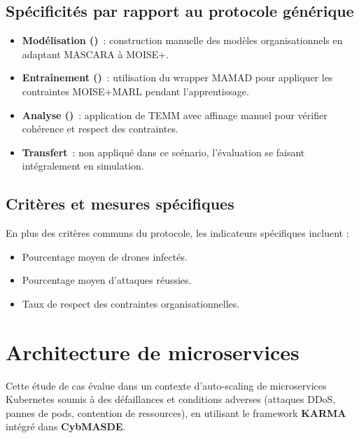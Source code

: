 \subsection{Spécificités par rapport au protocole générique}
\begin{itemize}
  \item \textbf{Modélisation ()}~: construction manuelle des modèles organisationnels en adaptant MASCARA à MOISE+.
  \item \textbf{Entraînement ()}~: utilisation du wrapper MAMAD pour appliquer les contraintes MOISE+MARL pendant l’apprentissage.
  \item \textbf{Analyse ()}~: application de TEMM avec affinage manuel pour vérifier cohérence et respect des contraintes.
  \item \textbf{Transfert}~: non appliqué dans ce scénario, l’évaluation se faisant intégralement en simulation.
\end{itemize}

\subsection{Critères et mesures spécifiques}
En plus des critères communs du protocole, les indicateurs spécifiques incluent :
\begin{itemize}
  \item Pourcentage moyen de drones infectés.
  \item Pourcentage moyen d’attaques réussies.
  \item Taux de respect des contraintes organisationnelles.
\end{itemize}

\section{Architecture de microservices}
\label{sec:microservices}

Cette étude de cas évalue  dans un contexte d’auto-scaling de microservices Kubernetes soumis à des défaillances et conditions adverses (attaques DDoS, pannes de pods, contention de ressources), en utilisant le framework \textbf{KARMA} intégré dans \textbf{CybMASDE}.


